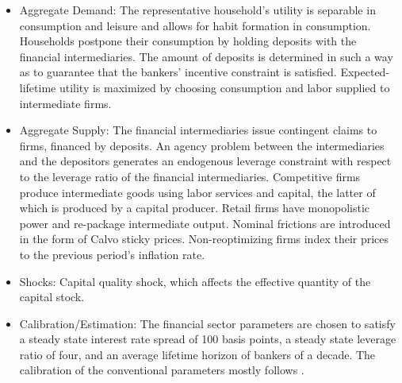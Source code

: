 \documentclass[11pt,a4paper]{article}
\begin{document}
	\begin{itemize}
		
		\item Aggregate Demand:  The representative household's utility is separable in consumption and leisure and allows for habit formation in consumption. Households postpone their consumption by holding deposits with the financial intermediaries. The amount of deposits is determined in such a way as to guarantee that the bankers' incentive constraint is satisfied. Expected-lifetime utility is maximized by choosing consumption and labor supplied to intermediate firms.
		
		\item Aggregate Supply: The financial intermediaries issue contingent claims to firms, financed by  deposits. An agency problem between the intermediaries and the depositors generates an endogenous leverage constraint with respect to the leverage ratio of the financial intermediaries. Competitive firms produce intermediate goods using labor services and capital, the latter of which is produced by a capital producer. Retail firms have monopolistic power and re-package intermediate output. Nominal frictions are introduced in the form of Calvo sticky prices. Non-reoptimizing firms index their prices to the previous period's inflation rate.
		
		\item Shocks: Capital quality shock, which affects the effective quantity of the capital stock.
		
		\item Calibration/Estimation: The financial sector parameters are chosen to satisfy a steady state interest rate spread of 100 basis points, a steady state leverage ratio of four, and an average lifetime horizon of bankers of a decade. The calibration of the conventional parameters mostly follows \cite{ChristianoEichenbaumEvans2005}.
		
		
	\end{itemize}
	
	
	
\end{document}
